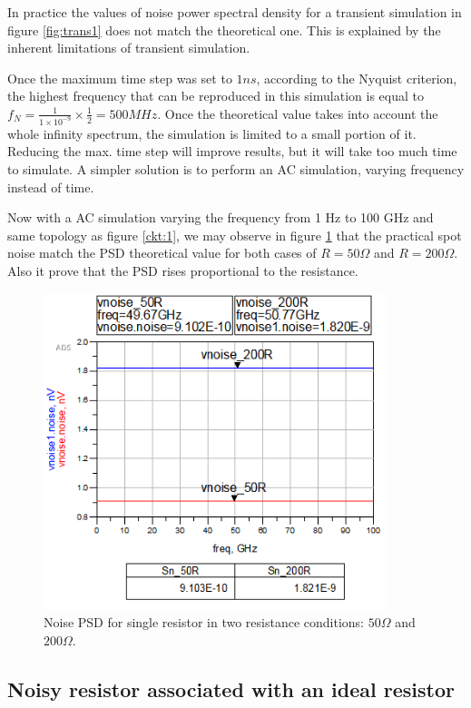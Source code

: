 In practice the values of noise power spectral density for a transient simulation in figure \ref{fig:trans1} does not match the theoretical one. This is explained by the inherent limitations of transient simulation. 

Once the maximum time step was set to $1ns$, according to the Nyquist criterion, the highest frequency that can be reproduced in this simulation is equal to $f_N = \frac{1}{1 \times 10^{-9}} \times \frac{1}{2} = 500 MHz$. Once the theoretical value takes into account the whole infinity spectrum, the simulation is limited to a small portion of it. Reducing the max. time step will improve results, but it will take too much time to simulate. A simpler solution is to perform an AC simulation, varying frequency instead of time.

Now with a AC simulation varying the frequency from 1 Hz to 100 GHz and same topology as figure \ref{ckt:1}, we may observe in figure \ref{fig:ac1} that the practical spot noise match the PSD theoretical value for both cases of $R = 50\Omega$ and $R= 200 \Omega$. Also it prove that the PSD rises proportional to the resistance.

\begin{figure}[H] 
\centering
\includegraphics[width=10cm]{images/vnoise_ac.png}
\caption{Noise PSD for single resistor in two resistance conditions: $50 \Omega$ and $200 \Omega$.}
\label{fig:ac1} 
\end{figure}


\subsection{Noisy resistor associated with an ideal resistor}

